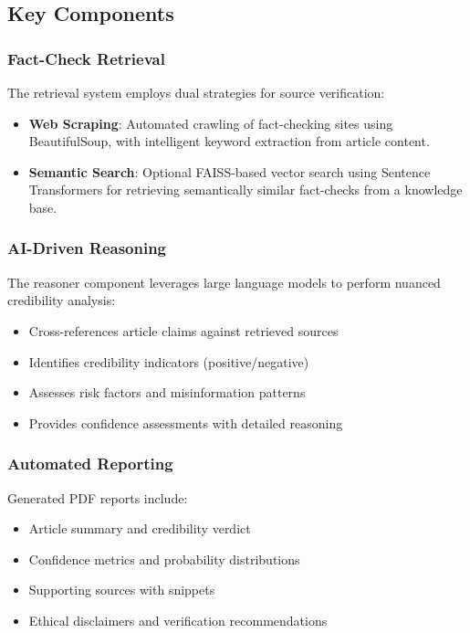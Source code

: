 \documentclass[conference]{IEEEtran}
\begin{document}
\subsection{Key Components}

\subsubsection{Fact-Check Retrieval}

The retrieval system employs dual strategies for source verification:

\begin{itemize}
    \item \textbf{Web Scraping}: Automated crawling of fact-checking sites using BeautifulSoup, with intelligent keyword extraction from article content.
    \item \textbf{Semantic Search}: Optional FAISS-based vector search using Sentence Transformers for retrieving semantically similar fact-checks from a knowledge base.
\end{itemize}

\subsubsection{AI-Driven Reasoning}

The reasoner component leverages large language models to perform nuanced credibility analysis:

\begin{itemize}
    \item Cross-references article claims against retrieved sources
    \item Identifies credibility indicators (positive/negative)
    \item Assesses risk factors and misinformation patterns
    \item Provides confidence assessments with detailed reasoning
\end{itemize}

\subsubsection{Automated Reporting}

Generated PDF reports include:

\begin{itemize}
    \item Article summary and credibility verdict
    \item Confidence metrics and probability distributions
    \item Supporting sources with snippets
    \item Ethical disclaimers and verification recommendations
\end{itemize}
\end{document}
